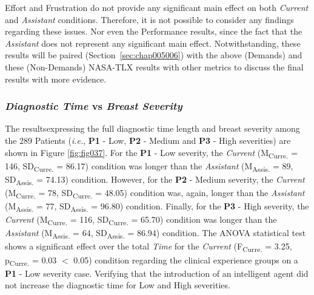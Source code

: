 Effort and Frustration do not provide any significant main effect on both {\it Current} and {\it Assistant} conditions.
Therefore, it is not possible to consider any findings regarding these issues.
Nor even the Performance results, since the fact that the {\it Assistant} does not represent any significant main effect.
Notwithstanding, these results will be paired (Section~\ref{sec:chap005006}) with the above (Demands) and these (Non-Demands) \ac{NASA-TLX} results with other metrics to discuss the final results with more evidence.

\subsubsection{{\it Diagnostic Time} vs {\it Breast Severity}}
\label{sec:chap005006001005}

The results\footnotemark[28] expressing the full diagnostic time length and breast severity among the 289 Patients ({\it i.e.}, {\bf P1} - Low, {\bf P2} - Medium and {\bf P3} - High severities) are shown in Figure \ref{fig:fig037}.
For the {\bf P1} - Low severity, the {\it Current} (M\textsubscript{Curre.} = 146, SD\textsubscript{Curre.} = 86.17) condition was longer than the {\it Assistant} (M\textsubscript{Assis.} = 89, SD\textsubscript{Assis.} = 74.13) condition.
However, for the {\bf P2} - Medium severity, the {\it Current} (M\textsubscript{Curre.} = 78, SD\textsubscript{Curre.} = 48.05) condition was, again, longer than the {\it Assistant} (M\textsubscript{Assis.} = 77, SD\textsubscript{Assis.} = 96.80) condition.
Finally, for the {\bf P3} - High severity, the {\it Current} (M\textsubscript{Curre.} = 116, SD\textsubscript{Curre.} = 65.70) condition was longer than the {\it Assistant} (M\textsubscript{Assis.} = 64, SD\textsubscript{Assis.} = 86.94) condition.
The \ac{ANOVA} statistical test shows a significant effect over the total {\it Time} for the {\it Current} (F\textsubscript{Curre.} = 3.25, p\textsubscript{Curre.} = 0.03 $<$ 0.05) condition regarding the clinical experience groups on a {\bf P1} - Low severity case.
Verifying that the introduction of an intelligent agent did not increase the diagnostic time for Low and High severities.


